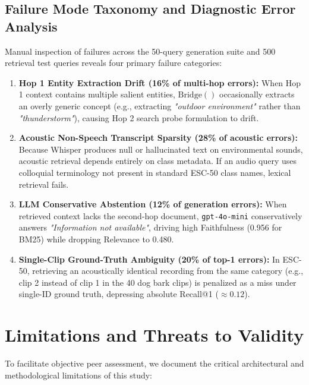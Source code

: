 \documentclass[conference]{IEEEtran}
\begin{document}
\subsection{Failure Mode Taxonomy and Diagnostic Error Analysis}
Manual inspection of failures across the 50-query generation suite and 500 retrieval test queries reveals four primary failure categories:
\begin{enumerate}
    \item \textbf{Hop 1 Entity Extraction Drift (16\% of multi-hop errors):} When Hop 1 context contains multiple salient entities, $\text{Bridge}()$ occasionally extracts an overly generic concept (e.g., extracting \textit{"outdoor environment"} rather than \textit{"thunderstorm"}), causing Hop 2 search probe formulation to drift.
    \item \textbf{Acoustic Non-Speech Transcript Sparsity (28\% of acoustic errors):} Because Whisper produces null or hallucinated text on environmental sounds, acoustic retrieval depends entirely on class metadata. If an audio query uses colloquial terminology not present in standard ESC-50 class names, lexical retrieval fails.
    \item \textbf{LLM Conservative Abstention (12\% of generation errors):} When retrieved context lacks the second-hop document, \texttt{gpt-4o-mini} conservatively answers \textit{"Information not available"}, driving high Faithfulness (0.956 for BM25) while dropping Relevance to 0.480.
    \item \textbf{Single-Clip Ground-Truth Ambiguity (20\% of top-1 errors):} In ESC-50, retrieving an acoustically identical recording from the same category (e.g., clip 2 instead of clip 1 in the 40 dog bark clips) is penalized as a miss under single-ID ground truth, depressing absolute Recall@1 ($\approx 0.12$).
\end{enumerate}

\section{Limitations and Threats to Validity}

To facilitate objective peer assessment, we document the critical architectural and methodological limitations of this study:
\end{document}
